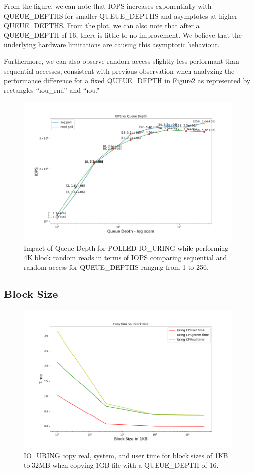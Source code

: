 \documentclass{article}
\begin{document}
From the figure, we can note that IOPS increases exponentially with QUEUE\_DEPTHS for smaller QUEUE\_DEPTHS and asymptotes at 
higher QUEUE\_DEPTHS. From the plot, we can also note that after a QUEUE\_DEPTH of 16, there is little to no improvement. We 
believe that the underlying hardware limitations are causing this asymptotic behaviour.

Furthermore, we can also observe random access slightly less performant than sequential accesses, 
consistent with previous observation when analyzing the performance 
difference for a fixed QUEUE\_DEPTH in Figure2 as represented by rectangles “iou\_rnd” and “iou.”

\begin{figure}
    \centering
    \includegraphics[scale = 0.3]{queue_depth.png}
    \caption{Impact of Queue Depth for POLLED IO\_URING while performing 4K block random reads in terms of 
    IOPS comparing sequential and random access for QUEUE\_DEPTHS ranging from 1 to 256.}
    \label{Figure3}
\end{figure}

\subsection{Block Size}
\begin{figure}
    \centering
    \includegraphics[scale = 0.3]{cp_bs.png}
    \caption{IO\_URING copy real, system, and user time for block sizes of 1KB to 32MB when copying 
    1GB file with a QUEUE\_DEPTH of 16.}
    \label{Figure5}
\end{figure}
\end{document}

